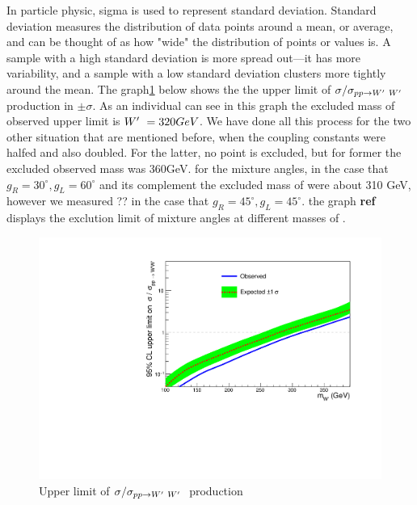 In particle physic, sigma is used to represent standard deviation. Standard deviation measures the distribution of data points around a mean, or average, and can be thought of as how "wide" the distribution of points or values is. A sample with a high standard deviation is more spread out—it has more variability, and a sample with a low standard deviation clusters more tightly around the mean. The graph\ref{fig:brazil} below shows the the upper limit of $\sigma/\sigma_{pp \rightarrow W^\prime~ W^\prime~}$ production in $\pm\sigma$. 
As an individual can see in this graph the excluded mass of observed upper limit is $W^\prime~=320GeV$.
 We have done all this process for the two other situation that are mentioned before, when the coupling constants were halfed and also doubled. For the latter, no point is excluded, but for former the excluded observed mass was 360GeV.
for the mixture angles, in the case that $g_R=30^\circ,g_L=60^\circ$ and its complement the excluded mass of \wprime were about 310 GeV, however we measured ?? in the case that $g_R=45^\circ,g_L=45^\circ$. the graph {\bf ref} displays the exclution limit of mixture angles at different masses of \wprime.

\begin{figure}[!ht]
\centering
\includegraphics*[width=.45\textwidth]{figs/brazilianFlag.pdf}
\caption{Upper limit of $\sigma/\sigma_{pp \rightarrow W^\prime~ W^\prime~}$ production }
\label{fig:brazil}
\end{figure}
